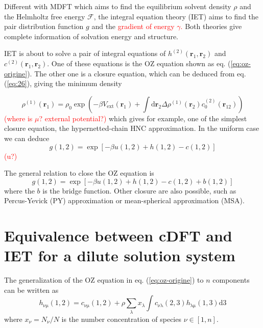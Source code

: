 Different with \acs{MDFT} which aims to find the equilibrium solvent
density $\rho$ and the Helmholtz free energy $\mathcal{F}$, the
integral equation theory (\acs{IET}) aims to find the pair distribution
function $g$ and the \textcolor{red}{gradient of energy $\gamma$.}
Both theories give complete information of solvation energy and structure.

\acs{IET} is about to solve a pair of integral equations of $h^{(2)}(\mathbf{r}_{1},\mathbf{r}_{2})$
and $c^{(2)}(\mathbf{r}_{1},\mathbf{r}_{2})$. One of these equations
is the \acs{OZ} equation shown as eq. (\ref{eq:oz-origine}). The
other one is a closure equation, which can be deduced from eq. (\ref{eq:26}),
giving the minimum density 

\begin{equation}
\rho^{(1)}(\mathbf{r}_{1})=\rho_{0}\exp\left(-\beta V_{\mathrm{ext}}(\mathbf{r}_{1})+\int\mathrm{d}\mathbf{\mathbf{r}}_{2}\Delta\rho^{(1)}(\mathbf{r}_{2})c_{0}^{(2)}(\mathbf{r}_{12})\right)\label{eq:minimize-anal}
\end{equation}
\textcolor{red}{(where is $\mu$? external potential?)} which gives
for example, one of the simplest closure equation, the hypernetted-chain
\acs{HNC} approximation. In the uniform case we can deduce
\begin{equation}
g(1,2)=\exp\left[-\beta u(1,2)+h(1,2)-c(1,2)\right]
\end{equation}
\textcolor{red}{(u?) }

The general relation to close the OZ equation is
\begin{equation}
g(1,2)=\exp\left[-\beta u(1,2)+h(1,2)-c(1,2)+b(1,2)\right]
\end{equation}
where the $b$ is the bridge function. Other closure are also possible,
such as Percus-Yevick (PY) approximation or mean-spherical approximation
(MSA).

\section{Equivalence between c\acs{DFT} and \acs{IET} for a dilute solution
system}

The generalization of the \acs{OZ} equation in eq. (\ref{eq:oz-origine})
to $n$ components can be written as
\begin{equation}
h_{\mathrm{\nu\mu}}(1,2)=c_{\mathrm{\nu\mu}}(1,2)+\rho\sum_{\lambda}x_{\lambda}\int c_{\mathrm{\nu\lambda}}(2,3)h_{\mathrm{\lambda\mu}}(1,3)\mathrm{d}3
\end{equation}
where $x_{\nu}=N_{\nu}/N$ is the number concentration of species
$\nu\in\left[1,n\right]$.

